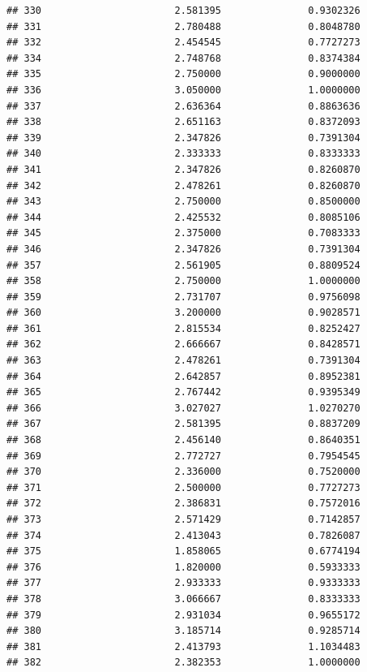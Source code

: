 \documentclass[]{article}
\begin{document}
\begin{verbatim}
## 330                       2.581395               0.9302326
## 331                       2.780488               0.8048780
## 332                       2.454545               0.7727273
## 334                       2.748768               0.8374384
## 335                       2.750000               0.9000000
## 336                       3.050000               1.0000000
## 337                       2.636364               0.8863636
## 338                       2.651163               0.8372093
## 339                       2.347826               0.7391304
## 340                       2.333333               0.8333333
## 341                       2.347826               0.8260870
## 342                       2.478261               0.8260870
## 343                       2.750000               0.8500000
## 344                       2.425532               0.8085106
## 345                       2.375000               0.7083333
## 346                       2.347826               0.7391304
## 357                       2.561905               0.8809524
## 358                       2.750000               1.0000000
## 359                       2.731707               0.9756098
## 360                       3.200000               0.9028571
## 361                       2.815534               0.8252427
## 362                       2.666667               0.8428571
## 363                       2.478261               0.7391304
## 364                       2.642857               0.8952381
## 365                       2.767442               0.9395349
## 366                       3.027027               1.0270270
## 367                       2.581395               0.8837209
## 368                       2.456140               0.8640351
## 369                       2.772727               0.7954545
## 370                       2.336000               0.7520000
## 371                       2.500000               0.7727273
## 372                       2.386831               0.7572016
## 373                       2.571429               0.7142857
## 374                       2.413043               0.7826087
## 375                       1.858065               0.6774194
## 376                       1.820000               0.5933333
## 377                       2.933333               0.9333333
## 378                       3.066667               0.8333333
## 379                       2.931034               0.9655172
## 380                       3.185714               0.9285714
## 381                       2.413793               1.1034483
## 382                       2.382353               1.0000000

\end{verbatim}
\end{document}
